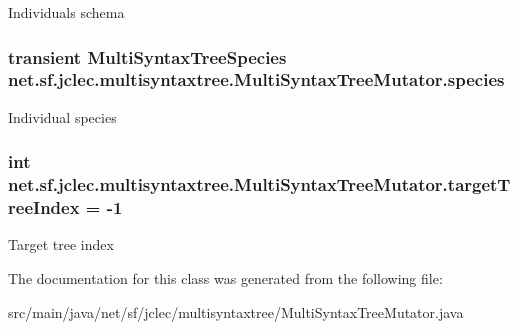 Individuals schema \hypertarget{classnet_1_1sf_1_1jclec_1_1multisyntaxtree_1_1_multi_syntax_tree_mutator_abe1fb65f82e0e91a6bbfd53492c767f6}{
\subsubsection[{species}]{\setlength{\rightskip}{0pt plus 5cm}transient {\bf Multi\-Syntax\-Tree\-Species} net.\-sf.\-jclec.\-multisyntaxtree.\-Multi\-Syntax\-Tree\-Mutator.\-species\hspace{0.3cm}{\ttfamily [protected]}}}\label{classnet_1_1sf_1_1jclec_1_1multisyntaxtree_1_1_multi_syntax_tree_mutator_abe1fb65f82e0e91a6bbfd53492c767f6}
Individual species \hypertarget{classnet_1_1sf_1_1jclec_1_1multisyntaxtree_1_1_multi_syntax_tree_mutator_aa35158c7c8029992a6c5679123583e50}{
\subsubsection[{target\-Tree\-Index}]{\setlength{\rightskip}{0pt plus 5cm}int net.\-sf.\-jclec.\-multisyntaxtree.\-Multi\-Syntax\-Tree\-Mutator.\-target\-Tree\-Index = -\/1\hspace{0.3cm}{\ttfamily [protected]}}}\label{classnet_1_1sf_1_1jclec_1_1multisyntaxtree_1_1_multi_syntax_tree_mutator_aa35158c7c8029992a6c5679123583e50}
Target tree index 

The documentation for this class was generated from the following file\-:\begin{DoxyCompactItemize}
\item 
src/main/java/net/sf/jclec/multisyntaxtree/Multi\-Syntax\-Tree\-Mutator.\-java\end{DoxyCompactItemize}
